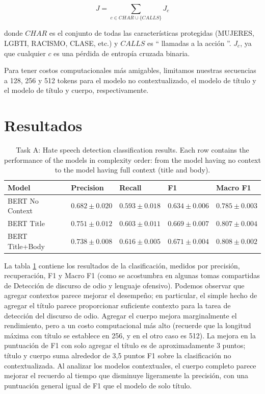 \begin{equation*}
    J = \sum\limits_{c \in CHAR \cup \{CALLS\}} J_c
\end{equation*}

donde $CHAR$ es el conjunto de todas las características protegidas (MUJERES, LGBTI, RACISMO, CLASE, etc.) y $CALLS$ es `` llamadas a la acción ''. $ J_c $, ya que cualquier $ c $ es una pérdida de entropía cruzada binaria.

Para tener costos computacionales más amigables, limitamos nuestras secuencias a 128, 256 y 512 tokens para el modelo no contextualizado, el modelo de título y el modelo de título y cuerpo, respectivamente.


\section{Resultados}


\begin{table}[ht!]
    \centering
    \begin{tabular}{lllll}
        \toprule
        Model &          Precision &             Recall &                 F1 &           Macro F1 \\
        \midrule
        BERT No Context &  $0.682 \pm 0.020$ &  $0.593 \pm 0.018$ &  $0.634 \pm 0.006$ &  $0.785 \pm 0.003$ \\
        BERT Title      &  $0.751 \pm 0.012$ &  $0.603 \pm 0.011$ &  $0.669 \pm 0.007$ &  $0.807 \pm 0.004$ \\
        BERT Title+Body &  $0.738 \pm 0.008$ &  $0.616 \pm 0.005$ &  $0.671 \pm 0.004$ &  $0.808 \pm 0.002$ \\
        \bottomrule
    \end{tabular}


    \caption{Task A: Hate speech detection classification results. Each row contains the performance of the models in complexity order: from the model having no context to the model having full context (title and body). }
    \label{tab:task_a_results}
\end{table}


La tabla \ref{tab:task_a_results} contiene los resultados de la clasificación, medidos por precisión, recuperación, F1 y Macro F1 (como se acostumbra en algunas tomas compartidas de Detección de discurso de odio y lenguaje ofensivo). Podemos observar que agregar contextos parece mejorar el desempeño; en particular, el simple hecho de agregar el título parece proporcionar suficiente contexto para la tarea de detección del discurso de odio. Agregar el cuerpo mejora marginalmente el rendimiento, pero a un costo computacional más alto (recuerde que la longitud máxima con título se establece en 256, y en el otro caso es 512). La mejora en la puntuación de F1 con solo agregar el título es de aproximadamente 3 puntos; título y cuerpo suma alrededor de 3,5 puntos F1 sobre la clasificación no contextualizada. Al analizar los modelos contextuales, el cuerpo completo parece mejorar el recuerdo al tiempo que disminuye ligeramente la precisión, con una puntuación general igual de F1 que el modelo de solo título.

